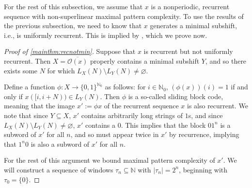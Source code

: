\documentclass[11pt,reqno]{amsart}
\newtheorem{proposition}[theorem]{Proposition}
\theoremstyle{definition}
\theoremstyle{plain}
\newcommand{\N}{\mathbb{N}}
\newcommand{\AuthornoteR}[2]{{\sf\small\color{blue}{[#1: #2]}}}
\newcommand{\rp}{\AuthornoteR{R}}
\begin{document}

For the rest of this subsection, we assume that $x$ is a nonperiodic, recurrent sequence with non-superlinear maximal pattern complexity. To use the results of the previous subsection, we need to know that $x$ generates a minimal subshift, i.e., is uniformly recurrent. This is implied by , which we prove now.%

\begin{proof}[Proof of \cref{mainthm:recnotmin}]

Suppose that $x$ is recurrent but not uniformly recurrent. Then $X = \overline{\mathcal{O}(x)}$ properly contains a minimal subshift $Y$, and so there exists some $N$ for which $L_X(N) \setminus L_Y(N) \neq \varnothing$.

Define a function $\phi: X \rightarrow \{0,1\}^{\N_0}$ as follows: for $i \in \N_0$, $(\phi(x))(i) = 1$ if and only if
$x([i, i+N)) \in L_Y(N)$. Then $\phi$ is a so-called sliding block code, meaning that the image $x' := \phi x$ of the recurrent sequence $x$ is also recurrent.
We note that since $Y \subseteq X$, $x'$ contains arbitrarily long strings of $1$s, and since $L_X(N) \setminus L_Y(N) \neq \varnothing$, $x'$ contains a $0$.  
This implies that the block $01^n$ is a subword of $x'$ for all $n$, and so must appear twice in $x'$ by recurrence, implying that $1^n 0$ is also a subword of $x'$ for all $n$. 

For the rest of this argument we bound maximal pattern complexity of $x'$.
We will construct a sequence of windows $\tau_n \subseteq \mathbb{N}$ with $|\tau_n| = 2^n$, beginning with 
$\tau_0 = \{0\}$.


\end{proof}
\end{document}

